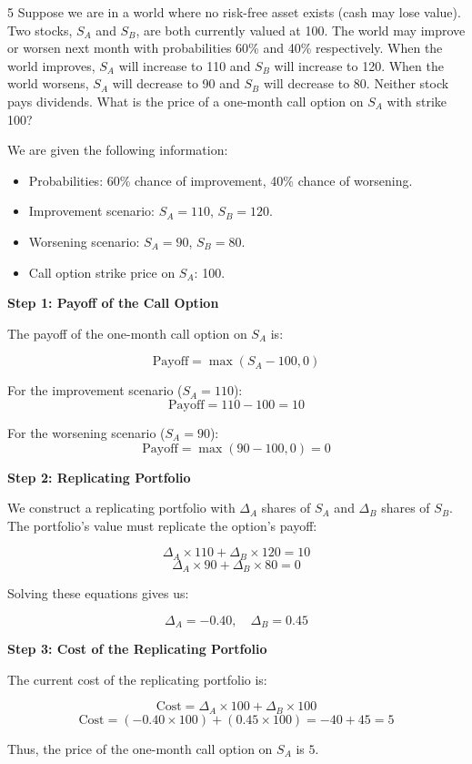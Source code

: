 \documentclass[12pt,letterpaper, onecolumn]{exam}
\begin{document}
\begin{question} 5
Suppose we are in a world where no risk-free asset exists (cash may lose value). Two stocks, \( S_A \) and \( S_B \), are both currently valued at 100. The world may improve or worsen next month with probabilities 60\% and 40\% respectively. When the world improves, \( S_A \) will increase to 110 and \( S_B \) will increase to 120. When the world worsens, \( S_A \) will decrease to 90 and \( S_B \) will decrease to 80. Neither stock pays dividends. What is the price of a one-month call option on \( S_A \) with strike 100?
\end{question}

\begin{solution}

We are given the following information:
\begin{itemize}
    \item Probabilities: 60\% chance of improvement, 40\% chance of worsening.
    \item Improvement scenario: \( S_A = 110 \), \( S_B = 120 \).
    \item Worsening scenario: \( S_A = 90 \), \( S_B = 80 \).
    \item Call option strike price on \( S_A \): 100.
\end{itemize}

\textbf{Step 1: Payoff of the Call Option}

The payoff of the one-month call option on \( S_A \) is:

\[
\text{Payoff} = \max(S_A - 100, 0)
\]

For the improvement scenario (\( S_A = 110 \)): 
\[
\text{Payoff} = 110 - 100 = 10
\]

For the worsening scenario (\( S_A = 90 \)): 
\[
\text{Payoff} = \max(90 - 100, 0) = 0
\]

\textbf{Step 2: Replicating Portfolio}

We construct a replicating portfolio with \( \Delta_A \) shares of \( S_A \) and \( \Delta_B \) shares of \( S_B \). The portfolio's value must replicate the option's payoff:

\[
\Delta_A \times 110 + \Delta_B \times 120 = 10
\]
\[
\Delta_A \times 90 + \Delta_B \times 80 = 0
\]

Solving these equations gives us:

\[
\Delta_A = -0.40, \quad \Delta_B = 0.45
\]

\textbf{Step 3: Cost of the Replicating Portfolio}

The current cost of the replicating portfolio is:

\[
\text{Cost} = \Delta_A \times 100 + \Delta_B \times 100
\]
\[
\text{Cost} = (-0.40 \times 100) + (0.45 \times 100) = -40 + 45 = 5
\]

Thus, the price of the one-month call option on \( S_A \) is \(\boxed{5}\).

\end{solution}
\end{document}
